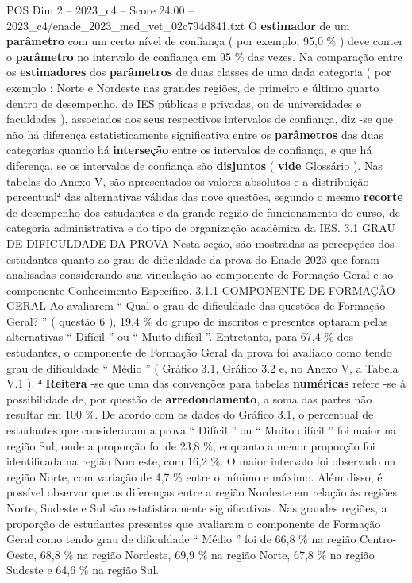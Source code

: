\begin{textsample}{POS Dim 2 – 2023\_c4 – Score 24.00 – 2023\_c4/enade\_2023\_med\_vet\_02c794d841.txt}
O \textbf{estimador} de um \textbf{parâmetro} com um certo nível de confiança ( por exemplo, 95,0 \% ) deve conter o \textbf{parâmetro} no intervalo de confiança em 95 \% das vezes.
Na comparação entre os \textbf{estimadores} dos \textbf{parâmetros} de duas classes de uma dada categoria ( por exemplo : Norte e Nordeste nas grandes regiões, de primeiro e último quarto dentro de desempenho, de IES públicas e privadas, ou de universidades e faculdades ), associados aos seus respectivos intervalos de confiança, diz -se que não há diferença estatisticamente significativa entre os \textbf{parâmetros} das duas categorias quando há \textbf{interseção} entre os intervalos de confiança, e que há diferença, se os intervalos de confiança são \textbf{disjuntos} ( \textbf{vide} Glossário ).
Nas tabelas do Anexo V, são apresentados os valores absolutos e a distribuição percentual⁴ das alternativas válidas das nove questões, segundo o mesmo \textbf{recorte} de desempenho dos estudantes e da grande região de funcionamento do curso, de categoria administrativa e do tipo de organização acadêmica da IES. 3.1 GRAU DE DIFICULDADE DA PROVA Nesta seção, são mostradas as percepções dos estudantes quanto ao grau de dificuldade da prova do Enade 2023 que foram analisadas considerando sua vinculação ao componente de Formação Geral e ao componente Conhecimento Específico. 3.1.1 COMPONENTE DE FORMAÇÃO GERAL Ao avaliarem “ Qual o grau de dificuldade das questões de Formação Geral? ” ( questão 6 ), 19,4 \% do grupo de inscritos e presentes optaram pelas alternativas “ Difícil ” ou “ Muito difícil ”.
Entretanto, para 67,4 \% dos estudantes, o componente de Formação Geral da prova foi avaliado como tendo grau de dificuldade “ Médio ” ( Gráfico 3.1, Gráfico 3.2 e, no Anexo V, a Tabela V.1 ). ⁴ \textbf{Reitera} -se que uma das convenções para tabelas \textbf{numéricas} refere -se à possibilidade de, por questão de \textbf{arredondamento}, a soma das partes não resultar em 100 \%.
De acordo com os dados do Gráfico 3.1, o percentual de estudantes que consideraram a prova “ Difícil ” ou “ Muito difícil ” foi maior na região Sul, onde a proporção foi de 23,8 \%, enquanto a menor proporção foi identificada na região Nordeste, com 16,2 \%.
O maior intervalo foi observado na região Norte, com variação de 4,7 \% entre o mínimo e máximo.
Além disso, é possível observar que as diferenças entre a região Nordeste em relação às regiões Norte, Sudeste e Sul são estatisticamente significativas.
Nas grandes regiões, a proporção de estudantes presentes que avaliaram o componente de Formação Geral como tendo grau de dificuldade “ Médio ” foi de 66,8 \% na região Centro-Oeste, 68,8 \% na região Nordeste, 69,9 \% na região Norte, 67,8 \% na região Sudeste e 64,6 \% na região Sul.

\end{textsample}
